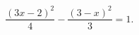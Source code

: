 \begin{ex}[type=equation]
	\begin{condition}
		$\dfrac{(3x - 2)^2}{4} - \dfrac{(3-x)^2}{3} = 1.$
	\end{condition}
\end{ex}